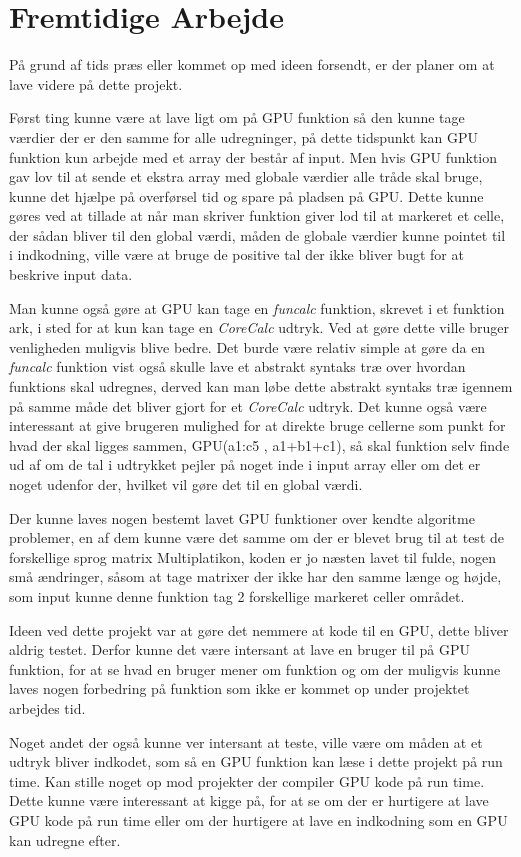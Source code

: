 \section{Fremtidige Arbejde}
På grund af tids præs eller kommet op med ideen forsendt, er der planer om at lave videre på dette projekt.

Først ting kunne være at lave ligt om på GPU funktion så den kunne tage værdier der er den samme for alle udregninger, på dette tidspunkt kan GPU funktion kun arbejde med et array der består af input. Men hvis GPU funktion gav lov til at sende et ekstra array med globale værdier alle tråde skal bruge, kunne det hjælpe på overførsel tid og spare på pladsen på GPU. Dette kunne gøres ved at tillade at når man skriver funktion giver lod til at markeret et celle, der sådan bliver til den global værdi, måden de globale værdier kunne pointet til i indkodning, ville være at bruge de positive tal der ikke bliver bugt for at beskrive input data.

Man kunne også gøre at GPU kan tage en \textit{funcalc} funktion, skrevet i et funktion ark, i sted for at kun kan tage en \textit{CoreCalc} udtryk. Ved at gøre dette ville bruger venligheden muligvis blive bedre. Det burde være relativ simple at gøre da en \textit{funcalc} funktion vist også skulle lave et abstrakt syntaks træ over hvordan funktions skal udregnes, derved kan man løbe dette abstrakt syntaks træ igennem på samme måde det bliver gjort for et \textit{CoreCalc} udtryk. Det kunne også være interessant at give brugeren mulighed for at direkte bruge cellerne som punkt for hvad der skal ligges sammen, GPU(a1:c5 , a1+b1+c1), så skal funktion selv finde ud af om de tal i udtrykket pejler på noget inde i input array eller om det er noget udenfor der, hvilket vil gøre det til en global værdi. 

Der kunne laves nogen bestemt lavet GPU funktioner over kendte algoritme problemer, en af dem kunne være det samme om der er blevet brug til at test de forskellige sprog matrix Multiplatikon, koden er jo næsten lavet til fulde, nogen små ændringer, såsom at tage matrixer der ikke har den samme længe og højde, som input kunne denne funktion tag 2 forskellige markeret celler området.

Ideen ved dette projekt var at gøre det nemmere at kode til en GPU, dette bliver aldrig testet. Derfor kunne det være intersant at lave en bruger til på GPU funktion, for at se hvad en bruger mener om funktion og om der muligvis kunne laves nogen forbedring på funktion som ikke er kommet op under projektet arbejdes tid.

Noget andet der også kunne ver intersant at teste, ville være om måden at et udtryk bliver indkodet, som så en GPU funktion kan læse i dette projekt på run time. Kan stille noget op mod projekter der compiler GPU kode på run time. Dette kunne være interessant at kigge på, for at se om der er hurtigere at lave GPU kode på run time eller om der hurtigere at lave en indkodning som en GPU kan udregne efter.